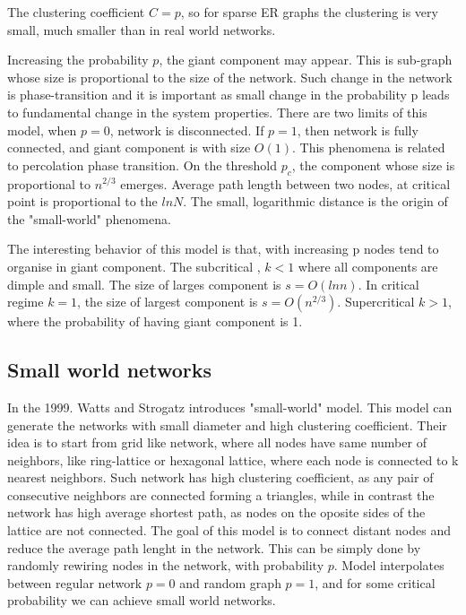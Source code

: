 The clustering coefficient $C=p$, so for sparse ER graphs the clustering is very small, much smaller than in real world networks.

Increasing the probability $p$, the giant component may appear. This is sub-graph whose size is proportional to the size of the network. Such change in the network is phase-transition and it is important as small change in the probability p leads to fundamental change in the system properties. There are two limits of this model, when $p=0$, network is disconnected. If $p=1$, then network is fully connected, and giant component is with size $O(1)$.  This phenomena is related to percolation phase transition. On the threshold $p_c$, the component whose size is proportional to $n^{2/3}$ emerges. Average path length between two nodes, at critical point is proportional to the $ln N$. The small, logarithmic distance is the origin of the "small-world" phenomena. 

The interesting behavior of this model is that, with increasing p nodes tend to organise in giant component. The subcritical , $k <1$ where all components are dimple and small. The size of larges component is $s=O(ln n)$. In critical regime $k=1$, the size of largest component is $s=O(n^{2/3})$. Supercritical $k>1$, where the probability of having giant component is 1.  


\subsection{Small world networks}

In the 1999. Watts and Strogatz introduces "small-world" model. This model can generate the networks with small diameter and high clustering coefficient. Their idea is to start from grid like network, where all nodes have same number of neighbors, like ring-lattice or hexagonal lattice, where each node is connected to k nearest neighbors. Such network has high clustering coefficient, as any pair of consecutive neighbors are connected forming a triangles, while in contrast the network has high average shortest path, as nodes on the oposite sides of the lattice are not connected. The goal of this model is to connect distant nodes and reduce the average path lenght in the network. This can be simply done by randomly rewiring nodes in the network, with probability $p$. Model interpolates between regular network $p=0$ and random graph $p=1$, and for some critical probability we can achieve small world networks. 


